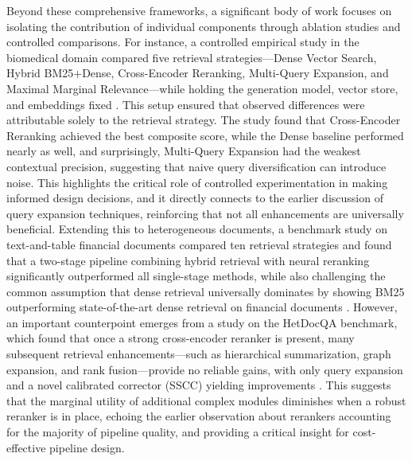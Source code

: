 \documentclass[11pt]{article}
\begin{document}
Beyond these comprehensive frameworks, a significant body of work focuses on isolating the contribution of individual components through ablation studies and controlled comparisons. For instance, a controlled empirical study in the biomedical domain compared five retrieval strategies---Dense Vector Search, Hybrid BM25+Dense, Cross-Encoder Reranking, Multi-Query Expansion, and Maximal Marginal Relevance---while holding the generation model, vector store, and embeddings fixed \cite{ref147}. This setup ensured that observed differences were attributable solely to the retrieval strategy. The study found that Cross-Encoder Reranking achieved the best composite score, while the Dense baseline performed nearly as well, and surprisingly, Multi-Query Expansion had the weakest contextual precision, suggesting that naive query diversification can introduce noise. This highlights the critical role of controlled experimentation in making informed design decisions, and it directly connects to the earlier discussion of query expansion techniques, reinforcing that not all enhancements are universally beneficial. Extending this to heterogeneous documents, a benchmark study on text-and-table financial documents compared ten retrieval strategies and found that a two-stage pipeline combining hybrid retrieval with neural reranking significantly outperformed all single-stage methods, while also challenging the common assumption that dense retrieval universally dominates by showing BM25 outperforming state-of-the-art dense retrieval on financial documents \cite{ref99}. However, an important counterpoint emerges from a study on the HetDocQA benchmark, which found that once a strong cross-encoder reranker is present, many subsequent retrieval enhancements---such as hierarchical summarization, graph expansion, and rank fusion---provide no reliable gains, with only query expansion and a novel calibrated corrector (SSCC) yielding improvements \cite{ref134}. This suggests that the marginal utility of additional complex modules diminishes when a robust reranker is in place, echoing the earlier observation about rerankers accounting for the majority of pipeline quality, and providing a critical insight for cost-effective pipeline design.
\end{document}
